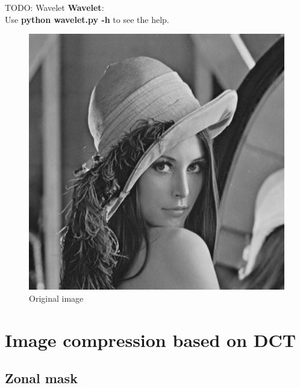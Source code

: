\bigskip

TODO: Wavelet
\textbf{Wavelet}: \\
Use \textbf{python wavelet.py -h} to see the help.

\pagebreak

\begin{figure}[!htb]\centering
    \includegraphics[width=0.6\linewidth]{./images/7/original.jpg}
    \caption{\small{Original image}}
\end{figure}

\pagebreak

\section{Image compression based on DCT}

\subsection{Zonal mask}

